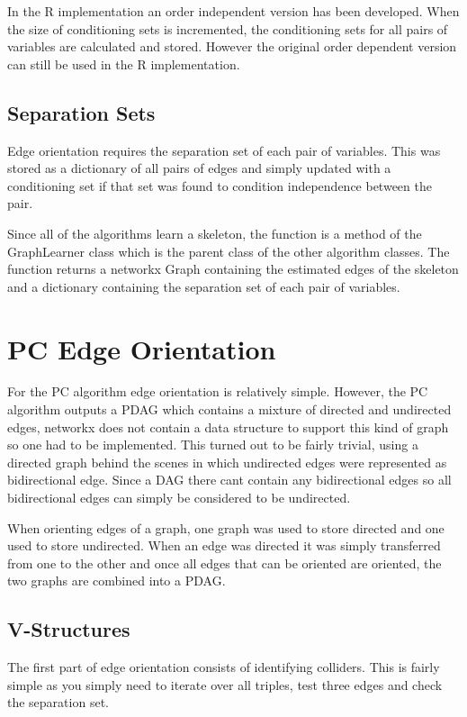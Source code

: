 \documentclass{UoYCSproject}
\begin{document}
In the R implementation an order independent version has been developed. When the size of conditioning sets is incremented, the conditioning sets for all pairs of variables  are calculated and stored. However the original order dependent version can still be used in the R implementation.

\subsection{Separation Sets}
Edge orientation requires the separation set of each pair of variables. This was stored as a dictionary of all pairs of edges and simply updated with a conditioning set if that set was found to condition independence between the pair.

Since all of the algorithms learn a skeleton, the function is a method of the GraphLearner class which is the parent class of the other algorithm classes. The function returns a networkx Graph containing the estimated edges of the skeleton and a dictionary containing the separation set of each pair of variables.

\section{PC Edge Orientation}
For the PC algorithm edge orientation is relatively simple. However, the PC algorithm outputs a PDAG which contains a mixture of directed and undirected edges, networkx does not contain a data structure to support this kind of graph so one had to be implemented. This turned out to be fairly trivial, using a directed graph behind the scenes in which undirected edges were represented as bidirectional edge. Since a DAG there cant contain any bidirectional edges so all bidirectional edges can simply be considered to be undirected.

When orienting edges of a graph, one graph was used to store directed and one used to store undirected. When an edge was directed it was simply transferred from one to the other and once all edges that can be oriented are oriented, the two graphs are combined into a PDAG.

\subsection{V-Structures}
The first part of edge orientation consists of identifying colliders. This is fairly simple as you simply need to iterate over all triples, test three edges and check the separation set.
\end{document}
